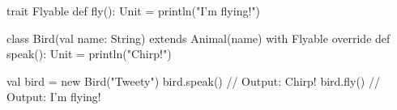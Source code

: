 trait Flyable {
  def fly(): Unit = println("I'm flying!")
}

class Bird(val name: String) extends Animal(name) with Flyable {
  override def speak(): Unit = println("Chirp!")
}

val bird = new Bird("Tweety")
bird.speak() // Output: Chirp!
bird.fly() // Output: I'm flying!